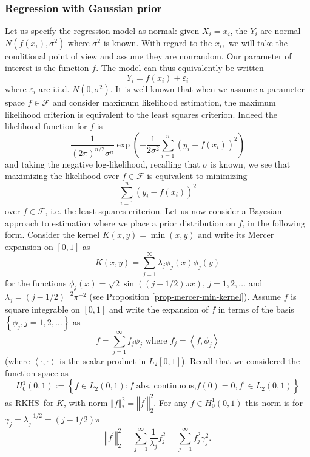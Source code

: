 \documentclass[11pt,twoside]{article}%
\theoremstyle{change}
\begin{document}
\subsubsection{Regression with Gaussian prior}

Let us specify the regression model as normal: given $X_{i}=x_{i}$, the
$Y_{i}$ are normal $N\left(  f(x_{i}),\sigma^{2}\right)  $ where $\sigma^{2}$
is known. With regard to the $x_{i},$ we will take the conditional point of
view and assume they are nonrandom. Our parameter of interest is the function
$f.$ The model can thus equivalently be written
\begin{equation}
Y_{i}=f(x_{i})+\varepsilon_{i}\label{reg-model-bay-1}%
\end{equation}
where $\varepsilon_{i}$ are i.i.d. $N(0,\sigma^{2})$. It is well known that
when we assume a parameter space $f\in\mathcal{F}$ and consider maximum
likelihood estimation, the maximum likelihood criterion is equivalent to the
least squares criterion. Indeed the likelihood function for $f$ is
\[
\frac{1}{\left(  2\pi\right)  ^{n/2}\sigma^{n}}\exp\left(  -\frac{1}%
{2\sigma^{2}}\sum_{i=1}^{n}\left(  y_{i}-f(x_{i})\right)  ^{2}\right)
\]
and taking the negative log-likelihood, recalling that $\sigma$ is known, we
see that maximizing the likelihood over $f\in\mathcal{F}$ is equivalent to
minimizing
\[
\sum_{i=1}^{n}\left(  y_{i}-f(x_{i})\right)  ^{2}%
\]
over $f\in\mathcal{F}$, i.e. the least squares criterion. Let us now consider
a Bayesian approach to estimation where we place a prior distribution on $f$,
in the following form. Consider the kernel $K(x,y)=\min(x,y)$ and write its
Mercer expansion on $[0,1]$ as
\begin{equation}
K(x,y)=\sum_{j=1}^{\infty}\lambda_{j}\phi_{j}(x)\phi_{j}%
(y)\label{mercer-expan-bayes}%
\end{equation}
for the functions $\phi_{j}(x)=\sqrt{2}\sin\left(  \left(  j-1/2\right)  \pi
x\right)  $, $j=1,2,\ldots$ and $\lambda_{j}=\left(  j-1/2\right)  ^{-2}%
\pi^{-2}$ (see Proposition \ref{prop-mercer-min-kernel}). Assume $f$ is square
integrable on $[0,1]$ and write the expansion of $f$ in terms of the basis
$\left\{  \phi_{j},j=1,2,\ldots\right\}  $ as
\[
f=\sum_{j=1}^{\infty}f_{j}\phi_{j}\text{ where }f_{j}=\left\langle f,\phi
_{j}\right\rangle
\]
(where $\left\langle \cdot,\cdot\right\rangle $ is the scalar product in
$L_{2}[0,1]$). Recall that we considered the function space as
\[
H_{0}^{1}(0,1):=\left\{  f\in L_{2}(0,1):f\text{ abs. continuous,
}f(0)=0,f^{\prime}\in L_{2}(0,1)\right\}
\]
as RKHS\ for $K$, with norm $\left\Vert f\right\Vert _{\ast}^{2}=\left\Vert
f^{\prime}\right\Vert _{2}^{2}$. For any $f\in H_{0}^{1}(0,1)$ this norm is
for $\gamma_{j}=\lambda_{j}^{-1/2}=\left(  j-1/2\right)  \pi$
\[
\left\Vert f^{\prime}\right\Vert _{2}^{2}=\sum_{j=1}^{\infty}\frac{1}%
{\lambda_{j}}f_{j}^{2}=\sum_{j=1}^{\infty}f_{j}^{2}\gamma_{j}^{2}.
\]
\bigskip
\end{document}
